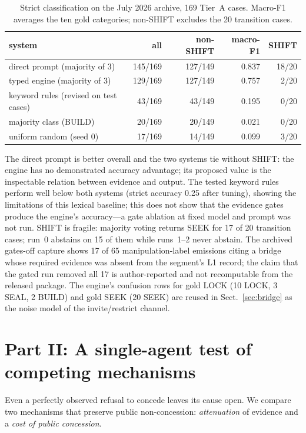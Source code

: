 \documentclass[runningheads]{llncs}
\begin{document}
\begin{table}[t]
\centering\caption{Strict classification on the July 2026 archive, 169 Tier~A cases. Macro-F1 averages the ten gold categories; non-SHIFT excludes the 20 transition cases.}
\label{tab:scores}
\footnotesize
\begin{tabular}{@{}lrrrr@{}}
\toprule
system & all & non-SHIFT & macro-F1 & SHIFT\\
\midrule
direct prompt (majority of 3) & 145/169 & 127/149 & 0.837 & 18/20\\
typed engine (majority of 3) & 129/169 & 127/149 & 0.757 & 2/20\\
keyword rules (revised on test cases) & 43/169 & 43/149 & 0.195 & 0/20\\
majority class (BUILD) & 20/169 & 20/149 & 0.021 & 0/20\\
uniform random (seed 0) & 17/169 & 14/149 & 0.099 & 3/20\\
\bottomrule
\end{tabular}
\end{table}

The direct prompt is better overall and the two systems tie without SHIFT: the engine has no demonstrated accuracy advantage; its proposed value is the inspectable relation between evidence and output. The tested keyword rules perform well below both systems (strict accuracy 0.25 after tuning), showing the limitations of this lexical baseline; this does not show that the evidence gates produce the engine's accuracy---a gate ablation at fixed model and prompt was not run. SHIFT is fragile: majority voting returns SEEK for 17 of 20 transition cases; run~0 abstains on 15 of them while runs~1--2 never abstain. The archived gates-off capture shows 17 of 65 manipulation-label emissions citing a bridge whose required evidence was absent from the segment's L1 record; the claim that the gated run removed all 17 is author-reported and not recomputable from the released package. The engine's confusion rows for gold LOCK (10 LOCK, 3 SEAL, 2 BUILD) and gold SEEK (20 SEEK) are reused in Sect.~\ref{sec:bridge} as the noise model of the invite/restrict channel.

\section{Part II: A single-agent test of competing mechanisms}
\label{sec:part2}
Even a perfectly observed refusal to concede leaves its cause open. We compare two mechanisms that preserve public non-concession: \emph{attenuation} of evidence and a \emph{cost of public concession}.
\end{document}
